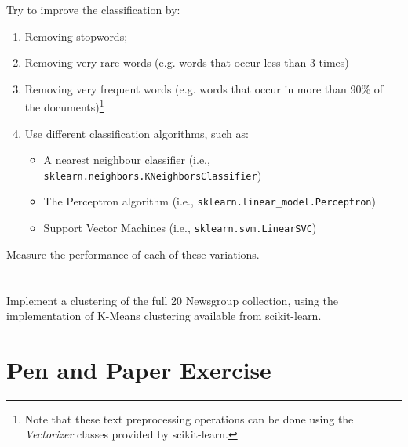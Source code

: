 \documentclass[12pt]{article}
\begin{document}
Try to improve the classification by:
\begin{enumerate}
\item Removing stopwords;
\item Removing very rare words (e.g. words that occur less than 3 times)
\item Removing very frequent words (e.g. words that occur in more than 90\% of the documents)\footnote{Note that these text preprocessing operations can be done using the \emph{Vectorizer} classes provided by scikit-learn.}
\item Use different classification algorithms, such as:
\begin{itemize}
\item A nearest neighbour classifier (i.e., \verb+sklearn.neighbors.KNeighborsClassifier+)
\item The Perceptron algorithm (i.e., \verb+sklearn.linear_model.Perceptron+)
\item Support Vector Machines (i.e., \verb+sklearn.svm.LinearSVC+)
\end{itemize}
\end{enumerate}

Measure the performance of each of these variations.

\section{}

Implement a clustering of the full 20 Newsgroup collection, using the implementation of K-Means clustering available from scikit-learn.



\section{Pen and Paper Exercise}
\end{document}
